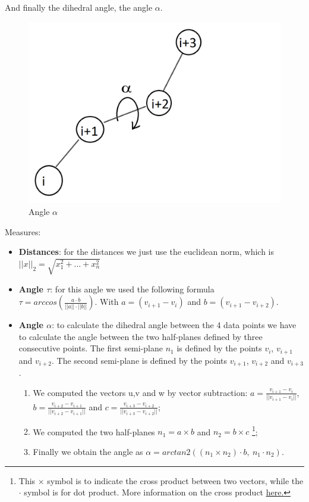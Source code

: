 \pagebreak
And finally the dihedral angle, the angle $\alpha$.

\begin{figure}[h!]
    \centering
    \includegraphics[scale=0.45]{res/dev/angleAlpha.png}
    \caption{Angle $\alpha$}
    \label{fig:enter-label}
\end{figure}

Measures:
\begin{itemize}
    \item \textbf{Distances}: for the distances we just use the euclidean norm, which is \\ {$||x||_2 = \sqrt{x_1^2 + ... + x_n^2}$}
    \item \textbf{Angle $\tau$}: for this angle we used the following formula \\ $\tau = arccos(\frac{a \cdot b}{||a|| \cdot ||b||})$. With $a = (v_{i+1}-v_i)$ and $b = (v_{i+1}-v_{i+2})$.  
    \item \textbf{Angle $\alpha$}: to calculate the dihedral angle between the 4 data points we have to calculate the angle between the two half-planes defined by three consecutive points. The first semi-plane $n_1$ is defined by the points $v_i$, $v_{i+1}$ and $v_{i+2}$. The second semi-plane is defined by the points $v_{i+1}$, $v_{i+2}$ and $v_{i+3}$.

    \pagebreak

    \begin{enumerate}
            \item We computed the vectors u,v and w by vector subtraction: $a = \frac{v_{i+1}-v_i}{||v_{i+1}-v_i||}$, $b = \frac{v_{i+2}-v_{i+1}}{||v_{i+2}-v_{i+1}||}$ and $c = \frac{v_{i+3}-v_{i+2}}{||v_{i+3}-v_{i+2}||}$;
            \item We computed the two half-planes $n_1 = a \times b$ and $n_2 = b \times c$ \footnote{This $\times$ symbol is to indicate the cross product between two vectors, while the $\cdot$ symbol is for dot product. More information on the cross product \href{https://en.wikipedia.org/wiki/Cross\_product}{\underline{here}.}};
            \item Finally we obtain the angle as $\alpha = arctan2((n_1\times n_2)\cdot b,\ n_1\cdot n_2)$.
    \end{enumerate}
\end{itemize}

